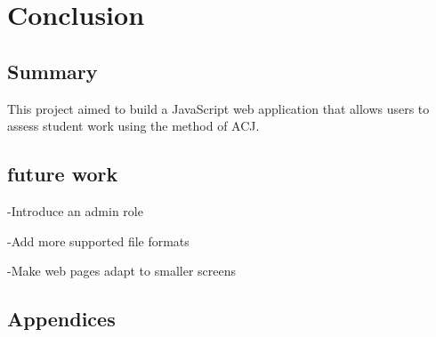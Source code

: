 \documentclass{l4proj}
\begin{document}
\chapter{Conclusion}    

\section{Summary}
This project aimed to build a JavaScript web application that allows users to assess student work using the method of ACJ.


\section{future work}
-Introduce an admin role

-Add more supported file formats

-Make web pages adapt to smaller screens

%
% 

\begin{appendices}

\chapter{Appendices}



\end{appendices}






\end{document}
